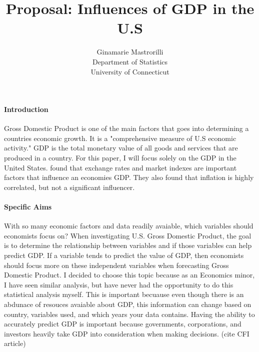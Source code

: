 \documentclass[12pt]{article}
\title{Proposal: Influences of GDP in the U.S }
\author{Ginamarie Mastrorilli\\
  Department of Statistics\\
  University of Connecticut
}
\begin{document}
\maketitle


\paragraph{Introduction}
Gross Domestic Product is one of the main factors that goes into determining a countries economic growth. 
It is a "comprehensive measure of U.S economic activity." \citet[]{gdp}
GDP is the total monetary value of all goods and services that are produced in a country. For this paper, I will focus solely on the GDP in the United States. 
\citet{divya2014study} found that exchange rates and market indexes are important factors that influence an economies GDP. They also found that inflation is highly correlated, but not a significant influencer.  

\paragraph{Specific Aims}
With so many economic factors and data readily avaiable, which variables should economists focus on?
When investigating U.S. Gross Domestic Product, the goal is to determine the relationship between variables and if those variables can help predict GDP.
If a variable tends to predict the value of GDP, then economists should focus more on these independent variables when forecasting Gross Domestic Product.
I decided to choose this topic because as an Economics minor, I have seen similar analysis, but have never had the opportunity to do this statistical analysis myself. 
This is important becuause even though there is an abdunace of resouces avaiable about GDP, this information can change based on country, variables used, and which years your data contains. 
Having the ability to accurately predict GDP is important because governments, corporations, and investors heavily take GDP into consideration when making decisions. (cite CFI article)
\end{document}

